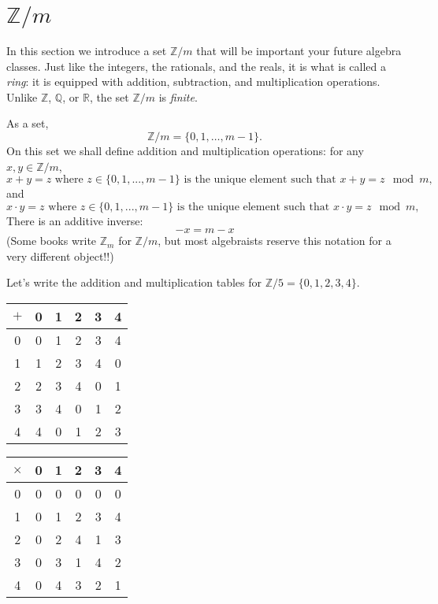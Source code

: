 \documentclass[11pt,dvipsnames]{book}
\numberwithin{figure}{section} %
\numberwithin{table}{section} %
\begin{document}
\section{$\mathbb{Z}/m$}

In this section we introduce a set $\mathbb{Z}/m$ that will be important your future algebra classes.
Just like the integers, the rationals, and the reals, it is what is called a \emph{ring}: it is equipped with addition, subtraction, and multiplication operations.
Unlike $\mathbb{Z}$, $\mathbb{Q}$, or $\mathbb{R}$, the set $\mathbb{Z}/m$ is {\it finite}.

As a set,
\[
\mathbb{Z}/m=\{0,1,\dots,m-1\}.
\]
On this set we shall define addition and multiplication operations: for any $x,y \in \mathbb{Z}/m$,
\[
x + y = z \mbox{ where $z\in \{0,1,...,m-1\}$ is the unique element such that } x + y = z\mod m,
\]
and
\[
x \cdot y = z \mbox{ where $z\in \{0,1,...,m-1\}$ is the unique element such that } x \cdot y = z\mod m,
\]
There is an additive inverse:
\[
- x = m-x
\]
(Some books write $\mathbb{Z}_m$ for $\mathbb{Z}/m$, but most algebraists reserve this notation for a very different object!!)

\begin{example}
Let's write the addition and multiplication tables for $\mathbb{Z}/5=\{0,1,2,3,4\}$.

\begin{center}
\begin{tabular}{| c| c | c | c | c | c |}
\hline
{$+$} & {0} & {1} & {2} & {3} & {4}\\
\hline
{0} & {0} & {1} & {2} & {3} & {4} \\
\hline
{1} & {1} & {2} & {3} & {4} & {0} \\
\hline
{2} & {2} & {3} & {4} & {0} & {1} \\
\hline
{3} & {3} & {4} & {0} & {1} & {2} \\
\hline
{4} & {4} & {0} & {1} & {2} & {3} \\
\hline
\end{tabular}

\smallskip

\begin{tabular}{| c| c | c | c | c | c |}
\hline
{$\times$} & {0} & {1} & {2} & {3} & {4}\\
\hline
{0} & {0} & {0} & {0} & {0} & {0} \\
\hline
{1} & {0} & {1} & {2} & {3} & {4} \\
\hline
{2} & {0} & {2} & {4} & {1} & {3} \\
\hline
{3} & {0} & {3} & {1} & {4} & {2} \\
\hline
{4} & {0} & {4} & {3} & {2} & {1} \\
\hline
\end{tabular}
\end{center}
\end{example}
\end{document}
